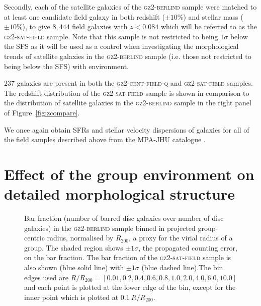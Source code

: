 \documentclass[useAMS,usenatbib]{mn2e}
\begin{document}
Secondly, each of the satellite galaxies of the \textsc{gz2-berlind} sample were matched to at least one candidate field galaxy in both redshift ($\pm10\%$) and stellar mass ($\pm10\%$), to give $8,444$ field galaxies with $z < 0.084$ which will be referred to as the \textsc{gz2-sat-field} sample.  Note that this sample is not restricted to being $1\sigma$ below the SFS as it will be used as a control when investigating the morphological trends of satellite galaxies in the \textsc{gz2-berlind} sample (i.e. those not restricted to being below the SFS) with environment. 

$237$ galaxies are present in both the \textsc{gz2-cent-field-q} and \textsc{gz2-sat-field} samples. The redshift distribution of the \textsc{gz2-sat-field} sample is shown in comparison to the distribution of satellite galaxies in the \textsc{gz2-berlind} sample in the right panel of Figure~\ref{fig:zcompare}.

We once again obtain SFRs and stellar velocity dispersions of galaxies for all of the field samples described above from the MPA-JHU catalogue \citep{kauffmann03, brinchmann04}.


\section{Effect of the group environment on detailed morphological structure}\label{sec:morphfrac}

\begin{figure}
\caption[Bar fraction with group radius in the \textsc{gz2-berlind} sample]{Bar fraction (number of barred disc galaxies over number of disc galaxies) in the \textsc{gz2-berlind} sample binned in projected group-centric radius, normalised by $R_{200}$, a proxy for the virial radius of a group. The shaded region shows $\pm1\sigma$, the propagated counting error, on the bar fraction. The bar fraction of the \textsc{gz2-sat-field} sample is also shown (blue solid line) with $\pm1\sigma$ (blue dashed line).The bin edges used are $R/R_{200} =  [0.01 ,   0.2,   0.4,   0.6,   0.8,   1.0 ,   2.0 ,   4.0 ,   6.0 ,  10.0]$ and each point is plotted at the lower edge of the bin, except for the inner point which is plotted at $0.1~R/R_{200}$.}
\label{fig:barradius}
\end{figure}
\end{document}
